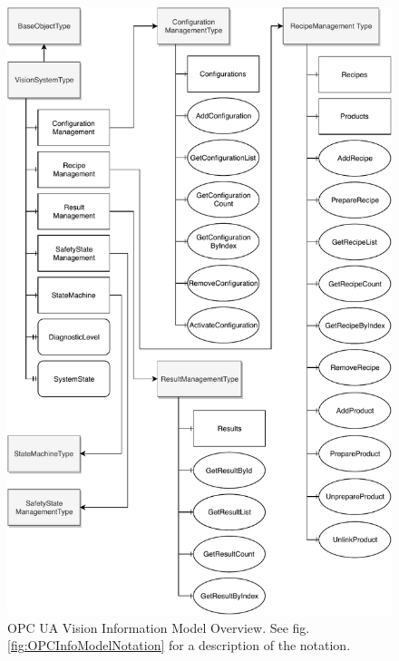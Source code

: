 \begin{figure}
    \centering
    \includegraphics[height=0.9\textheight]{img/OPCUAVisionInformationModelOverview.pdf}
    \caption[OPC UA Vision Information Model Overview]{OPC UA Vision Information Model Overview. See fig. \ref{fig:OPCInfoModelNotation} for a description of the notation.~\cite{VDMA2018OPC40100-1:2018-11}}
    \label{fig:OPCInfoModelOverview}
\end{figure}

